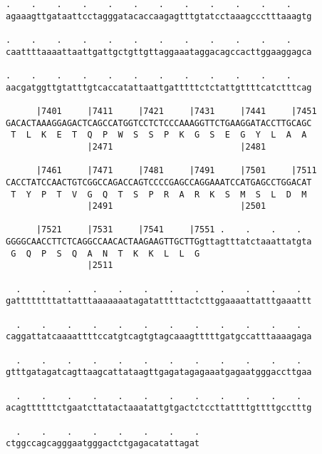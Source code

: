\documentclass{article}
\begin{document}
\begin{Verbatim}
.    .    .    .    .    .    .    .    .    .    .    .    
agaaagttgataattcctagggatacaccaagagtttgtatcctaaagccctttaaagtg
                                                            
.    .    .    .    .    .    .    .    .    .    .    .    
caattttaaaattaattgattgctgttgttaggaaataggacagccacttggaaggagca
                                                            
.    .    .    .    .    .    .    .    .    .    .    .    
aacgatggttgtatttgtcaccatattaattgatttttctctattgttttcatctttcag
                                                            
      |7401     |7411     |7421     |7431     |7441     |7451
GACACTAAAGGAGACTCAGCCATGGTCCTCTCCCAAAGGTTCTGAAGGATACCTTGCAGC
 T  L  K  E  T  Q  P  W  S  S  P  K  G  S  E  G  Y  L  A  A 
                |2471                         |2481         
  
      |7461     |7471     |7481     |7491     |7501     |7511
CACCTATCCAACTGTCGGCCAGACCAGTCCCCGAGCCAGGAAATCCATGAGCCTGGACAT
 T  Y  P  T  V  G  Q  T  S  P  R  A  R  K  S  M  S  L  D  M 
                |2491                         |2501         
  
      |7521     |7531     |7541     |7551 .    .    .    .  
GGGGCAACCTTCTCAGGCCAACACTAAGAAGTTGCTTGgttagtttatctaaattatgta
 G  Q  P  S  Q  A  N  T  K  K  L  L  G                      
                |2511                                       
  
  .    .    .    .    .    .    .    .    .    .    .    .  
gattttttttattatttaaaaaaatagatatttttactcttggaaaattatttgaaattt
                                                            
  .    .    .    .    .    .    .    .    .    .    .    .  
caggattatcaaaattttccatgtcagtgtagcaaagtttttgatgccatttaaaagaga
                                                            
  .    .    .    .    .    .    .    .    .    .    .    .  
gtttgatagatcagttaagcattataagttgagatagagaaatgagaatgggaccttgaa
                                                            
  .    .    .    .    .    .    .    .    .    .    .    .  
acagttttttctgaatcttatactaaatattgtgactctccttattttgttttgcctttg
                                                            
  .    .    .    .    .    .    .    .
ctggccagcagggaatgggactctgagacatattagat
                                      
                                      
 

\end{Verbatim}
\end{document}
